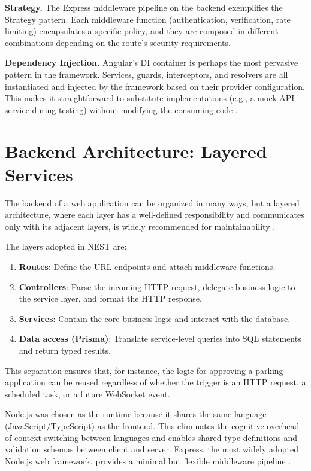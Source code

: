 \textbf{Strategy.} The Express middleware pipeline on the backend exemplifies the Strategy pattern. Each middleware function (authentication, verification, rate limiting) encapsulates a specific policy, and they are composed in different combinations depending on the route's security requirements.

\textbf{Dependency Injection.} Angular's DI container is perhaps the most pervasive pattern in the framework. Services, guards, interceptors, and resolvers are all instantiated and injected by the framework based on their provider configuration. This makes it straightforward to substitute implementations (e.g., a mock API service during testing) without modifying the consuming code \cite{fowler2002patterns}.

\section{Backend Architecture: Layered Services}

The backend of a web application can be organized in many ways, but a layered architecture, where each layer has a well-defined responsibility and communicates only with its adjacent layers, is widely recommended for maintainability \cite{fowler2002patterns}.

The layers adopted in NEST are:

\begin{enumerate}[nosep]
  \item \textbf{Routes}: Define the URL endpoints and attach middleware functions.
  \item \textbf{Controllers}: Parse the incoming HTTP request, delegate business logic to the service layer, and format the HTTP response.
  \item \textbf{Services}: Contain the core business logic and interact with the database.
  \item \textbf{Data access (Prisma)}: Translate service-level queries into SQL statements and return typed results.
\end{enumerate}

This separation ensures that, for instance, the logic for approving a parking application can be reused regardless of whether the trigger is an HTTP request, a scheduled task, or a future WebSocket event.

Node.js was chosen as the runtime because it shares the same language (JavaScript/TypeScript) as the frontend. This eliminates the cognitive overhead of context-switching between languages and enables shared type definitions and validation schemas between client and server. Express, the most widely adopted Node.js web framework, provides a minimal but flexible middleware pipeline \cite{expressDocs}.

